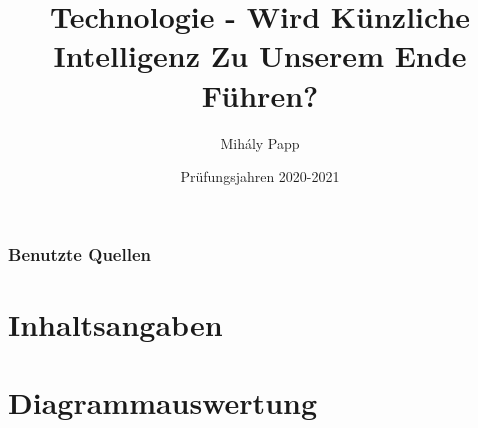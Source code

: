 \documentclass[12pt, a4paper, onecolumn, titlepage]{article}
\title{Technologie - Wird Künzliche Intelligenz Zu Unserem Ende Führen?}
\author{Mihály Papp \\
  \multicolumn{1}{p{.7\textwidth}}{\centering\emph{Friedrich Schiller Gymnasium und Schülerwohnheim, Klasse 12/5}}}
\date{Prüfungsjahren 2020-2021}
\begin{document}
\maketitle

\renewcommand{\cftpartleader}{\cftdotfill{\cftdotsep}}
\tableofcontents
\newpage


\newpage

\section{Benutzte Quellen}
\printbibliography[title={" "}, heading=subbibliography]
\newpage

\part{Inhaltsangaben}

\newpage

\part{Diagrammauswertung}

\newpage
\end{document}

